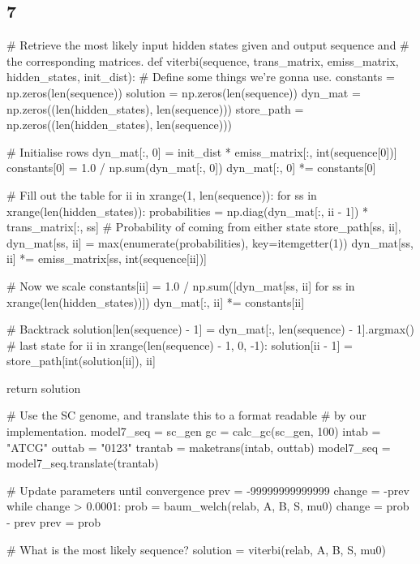 \documentclass[10pt]{article}\usepackage[]{graphicx}\usepackage[]{color}
\theoremstyle{plain}
\begin{document}
\subsection*{7}
\begin{Schunk}
\begin{Sinput}
# Retrieve the most likely input hidden states given and output sequence and
# the corresponding matrices.
def viterbi(sequence, trans_matrix, emiss_matrix, hidden_states, init_dist):
    # Define some things we're gonna use.
    constants = np.zeros(len(sequence))
    solution = np.zeros(len(sequence))
    dyn_mat = np.zeros((len(hidden_states), len(sequence)))
    store_path = np.zeros((len(hidden_states), len(sequence)))

    # Initialise rows
    dyn_mat[:, 0] = init_dist * emiss_matrix[:, int(sequence[0])]
    constants[0] = 1.0 / np.sum(dyn_mat[:, 0])
    dyn_mat[:, 0] *= constants[0]

    # Fill out the table
    for ii in xrange(1, len(sequence)):
        for ss in xrange(len(hidden_states)):
            probabilities = np.diag(dyn_mat[:, ii - 1]) * trans_matrix[:, ss]  # Probability of coming from either state
            store_path[ss, ii], dyn_mat[ss, ii] = max(enumerate(probabilities), key=itemgetter(1))
            dyn_mat[ss, ii] *= emiss_matrix[ss, int(sequence[ii])]

        # Now we scale
        constants[ii] = 1.0 / np.sum([dyn_mat[ss, ii] for ss in xrange(len(hidden_states))])
        dyn_mat[:, ii] *= constants[ii]

    # Backtrack
    solution[len(sequence) - 1] = dyn_mat[:, len(sequence) - 1].argmax()  # last state
    for ii in xrange(len(sequence) - 1, 0, -1):
        solution[ii - 1] = store_path[int(solution[ii]), ii]

    return solution

# Use the SC genome, and translate this to a format readable
# by our implementation.
model7_seq = sc_gen
gc = calc_gc(sc_gen, 100)
intab = "ATCG"
outtab = "0123"
trantab = maketrans(intab, outtab)
model7_seq = model7_seq.translate(trantab)

# Update parameters until convergence
prev = -99999999999999
change = -prev
while change > 0.0001:
    prob = baum_welch(relab, A, B, S, mu0)
    change = prob - prev
    prev = prob

# What is the most likely sequence?
solution = viterbi(relab, A, B, S, mu0)
\end{Sinput}
\end{Schunk}
\end{document}
